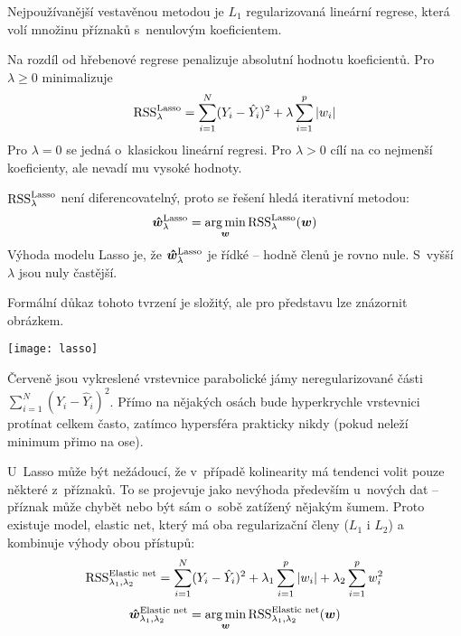 Nejpoužívanější vestavěnou metodou je $L_1$ regularizovaná lineární regrese, která volí množinu příznaků s~nenulovým koeficientem.

Na rozdíl od hřebenové regrese penalizuje absolutní hodnotu koeficientů. Pro $\lambda \ge 0$ minimalizuje
\[
    \operatorname{RSS}_\lambda^{\text{Lasso}} = \sum_{i=1}^{N} (Y_i - \hat{Y}_i)^2
    + \lambda \sum_{i=1}^{p} |w_i|
\]
Pro $\lambda = 0$ se jedná o~klasickou lineární regresi. Pro $\lambda > 0$ cílí na co nejmenší koeficienty, ale nevadí mu vysoké hodnoty.

$\operatorname{RSS}_\lambda^{\text{Lasso}}$ není diferencovatelný, proto se řešení hledá iterativní metodou:
\[
    \bm{\hat{w}}_\lambda^{\text{Lasso}} = \operatorname*{arg\,min}_{\bm{w}} \operatorname{RSS}_\lambda^{\text{Lasso}} (\bm{w})
\]
Výhoda modelu Lasso je, že $\bm{\hat{w}}_\lambda^{\text{Lasso}}$ je řídké -- hodně členů je rovno nule. S~vyšší $\lambda$ jsou nuly častější.

Formální důkaz tohoto tvrzení je složitý, ale pro představu lze znázornit obrázkem.

\begin{center}
    \texttt{[image: lasso]}
\end{center}

Červeně jsou vykreslené vrstevnice parabolické jámy neregularizované části ${\sum_{i=1}^{N} (Y_i - \hat{Y}_i)^2}$. Přímo na nějakých osách bude hyperkrychle vrstevnici protínat celkem často, zatímco hypersféra prakticky nikdy (pokud neleží minimum přimo na ose).

U~Lasso může být nežádoucí, že v~případě kolinearity má tendenci volit pouze některé z~příznaků. To se projevuje jako nevýhoda především u~nových dat -- příznak může chybět nebo být sám o~sobě zatížený nějakým šumem. Proto existuje model, elastic net, který má oba regularizační členy ($L_1$ i $L_2$) a kombinuje výhody obou přístupů:
\[
    \operatorname{RSS}_{\lambda_1, \lambda_2}^{\text{Elastic net}} = \sum_{i=1}^{N} (Y_i - \hat{Y}_i)^2
    + \lambda_1 \sum_{i=1}^{p} |w_i|
    + \lambda_2 \sum_{i=1}^{p} w_i^2
\]
\[
    \bm{\hat{w}}_{\lambda_1, \lambda_2}^{\text{Elastic net}}
    = \operatorname*{arg\,min}_{\bm{w}} \operatorname{RSS}_{\lambda_1, \lambda_2}^{\text{Elastic net}} (\bm{w})
\]
